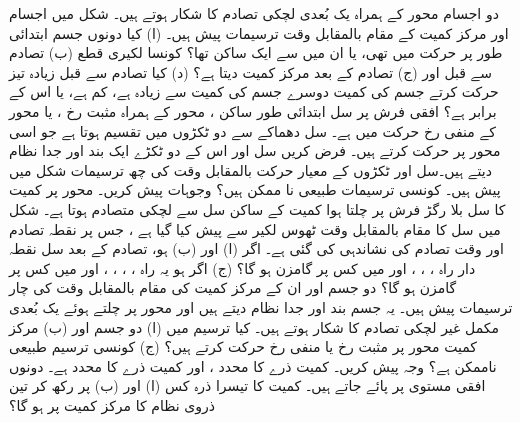 دو  اجسام   محور   کے ہمراہ یک بُعدی  لچکی تصادم  کا شکار ہوتے ہیں۔ شکل  میں  اجسام  اور     مرکز کمیت کے  مقام بالمقابل وقت  ترسیمات پیش ہیں۔ (ا) کیا دونوں جسم ابتدائی طور پر حرکت میں تھی، یا ان میں سے ایک ساکن تھا؟ کونسا لکیری قطع (ب)  تصادم سے قبل اور (ج) تصادم کے بعد  مرکز کمیت دیتا ہے؟ (د)  کیا تصادم سے قبل زیادہ تیز  حرکت کرتے جسم کی کمیت دوسرے جسم  کی کمیت سے زیادہ ہے، کم ہے، یا اس کے برابر ہے؟
افقی فرش پر  سل ابتدائی طور ساکن ، محور  کے ہمراہ مثبت رخ ، یا  محور کے منفی رخ حرکت میں ہے۔ سل دھماکے سے دو ٹکڑوں میں تقسیم ہوتا ہے جو اسی محور پر حرکت کرتے ہیں۔ فرض کریں سل اور اس کے دو ٹکڑے ایک بند اور جدا  نظام دیتے ہیں۔سل اور   ٹکڑوں کے معیار حرکت بالمقابل وقت    کی  چھ ترسیمات شکل  میں پیش ہیں۔ کونسی ترسیمات طبیعی نا ممکن ہیں؟ وجوہات پیش کریں۔
محور  پر کمیت  کا سل بلا رگڑ فرش پر  چلتا ہوا کمیت  کے ساکن سل سے لچکی   متصادم ہوتا  ہے۔ شکل   میں  سل  کا مقام   بالمقابل وقت   ٹھوس لکیر سے پیش  کیا گیا ہے ، جس پر  نقطہ    تصادم  اور وقت تصادم     کی نشاندہی کی گئی ہے۔ اگر (ا)    اور (ب)  ہو، تصادم کے بعد  سل  نقطہ دار راہ ، ،  ، اور  میں کس      پر   گامزن ہو گا؟ (ج)  اگر  ہو یہ راہ   ، ، ، ، اور   میں کس  پر گامزن ہو گا؟
دو  جسم  اور ان کے مرکز کمیت کی  مقام بالمقابل وقت  کی  چار ترسیمات پیش ہیں۔ یہ جسم بند اور جدا نظام دیتے ہیں اور محور  پر چلتے ہوئے یک بُعدی  مکمل غیر لچکی تصادم کا شکار ہوتے ہیں۔ کیا ترسیم  میں (ا) دو جسم اور (ب) مرکز کمیت محور  پر مثبت رخ یا منفی رخ حرکت  کرتے ہیں؟ (ج) کونسی ترسیم طبیعی ناممکن ہے؟ وجہ پیش کریں۔
کمیت   ذرے کا  محدد ، اور کمیت  ذرے کا  محدد   ہے۔ دونوں افقی مستوی پر پائے جاتے ہیں۔ کمیت  کا تیسرا ذرہ  کس (ا)  اور (ب)  پر رکھ کر تین ذروی نظام کا مرکز کمیت  پر ہو گا؟
